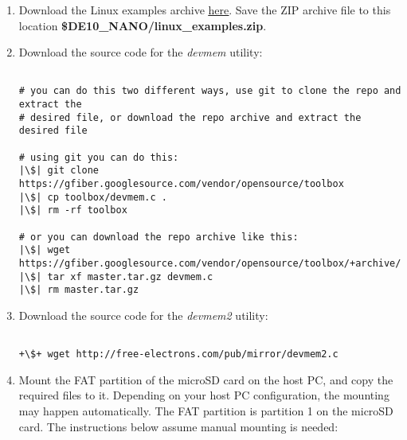 \begin{flushleft}
\begin{enumerate}[
	label=\textbf{Step \arabic*.},
	leftmargin=*,
	widest={00},
	align=left]
\begin{verbatim}
+\$+ sudo partprobe +\textcolor{red}{/dev/sdx}+

\end{verbatim}

\item Download the Linux examples archive \href{\TheReleasesURL/linux_examples.zip}{\underline{here}}.  Save the ZIP archive file to this location \textbf{\$DE10\_NANO/linux\_examples.zip}.


\item Download the source code for the \emph{devmem} utility:

\begin{verbatim}

# you can do this two different ways, use git to clone the repo and extract the
# desired file, or download the repo archive and extract the desired file

# using git you can do this:
|\$| git clone https://gfiber.googlesource.com/vendor/opensource/toolbox
|\$| cp toolbox/devmem.c .
|\$| rm -rf toolbox

# or you can download the repo archive like this:
|\$| wget https://gfiber.googlesource.com/vendor/opensource/toolbox/+archive/master.tar.gz
|\$| tar xf master.tar.gz devmem.c
|\$| rm master.tar.gz

\end{verbatim}

\item Download the source code for the \emph{devmem2} utility:

\begin{verbatim}

+\$+ wget http://free-electrons.com/pub/mirror/devmem2.c

\end{verbatim}

\item Mount the FAT partition of the microSD card on the host PC, and copy the required files to it. Depending on your host PC configuration, the mounting may happen automatically.  The FAT partition is partition 1 on the microSD card.  The instructions below assume manual mounting is needed:


\end{enumerate}
\end{flushleft}
